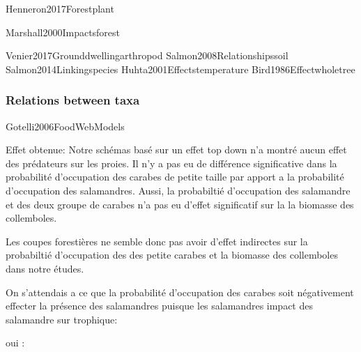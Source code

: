 Henneron2017Forestplant

Marshall2000Impactsforest

Venier2017Grounddwellingarthropod
Salmon2008Relationshipssoil
Salmon2014Linkingspecies
Huhta2001Effectstemperature
Bird1986Effectwholetree


\subsubsection*{Relations between taxa}
\label{disc:relations_between_taxa}

Gotelli2006FoodWebModels



Effet obtenue:
Notre schémas basé sur un effet top down n'a montré aucun effet des prédateurs sur les proies.
Il n'y a pas eu de différence significative dans la probabilité d'occupation des carabes de petite taille par apport a la probabilité d'occupation des salamandres.
Aussi, la probabiltié d'occupation des salamandre et des deux groupe de carabes n'a pas eu d'effet significatif sur la la biomasse des collemboles.

Les coupes forestières ne semble donc pas avoir d'effet indirectes sur la probabiltié d'occupation des des petite carabes et la biomasse des collemboles dans notre études.


On s'attendais a ce que la probabilité d'occupation des carabes soit négativement effecter la présence des salamandres puisque les salamandres 
 impact des salamandre sur trophique:

 oui : 

